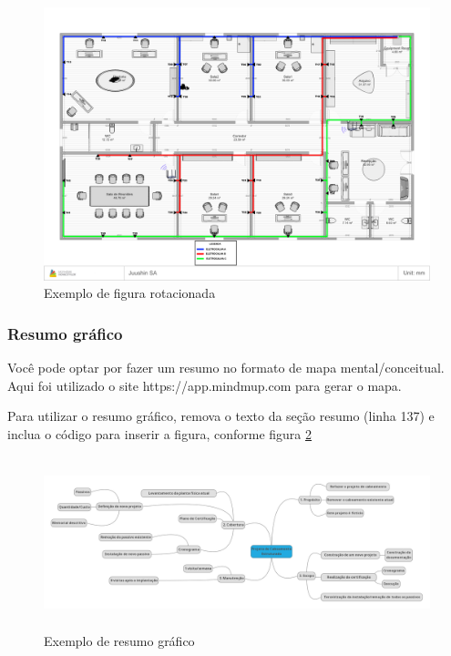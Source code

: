 \documentclass[	DIV=calc,%
paper=a4,%
fontsize=12pt,%
onecolumn]{scrartcl}	 					%
\begin{document}
	\begin{figure}
		\centering
		\includegraphics[height=\textwidth,angle=-90]{fig3}
		\caption{Exemplo de figura rotacionada}
		\label{fig3}
	\end{figure}
	
	\subsubsection{Resumo gráfico}
	
	Você pode optar por fazer um resumo no formato de mapa mental/conceitual. 
	Aqui foi utilizado o site https://app.mindmup.com para gerar o mapa.
	
	Para utilizar o resumo gráfico, remova o texto da seção resumo (linha 137) e inclua o código para inserir a figura, conforme figura \ref{fig4}
	
	\begin{figure}[h]
		\centering
		\includegraphics[width=\textwidth,height=5cm,keepaspectratio]{fig4}
		\caption{Exemplo de resumo gráfico}
		\label{fig4}	
	\end{figure}
	
	
\end{document}
